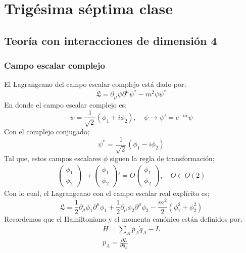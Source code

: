 \documentclass[../main.tex]{subfiles}
\begin{document}
\section{Trigésima séptima clase}
\subsection{Teoría con interacciones de dimensión 4}
\subsubsection{Campo escalar complejo}

El Lagrangeano del campo escalar complejo está dado por;
\begin{equation}
  \mathfrak{L} = \partial_\mu \psi \partial^\mu \psi^* -m^2 \psi\psi^* 
 \end{equation}
En donde el campo escalar complejo es;
\begin{equation}
  \psi = \frac{1}{\sqrt{2}} \left( \phi_1 + i\phi_2 \right), \quad \psi\rightarrow \psi'=e^{-i\alpha}\psi
 \end{equation}
Con el complejo conjugado;
\begin{equation}
  \psi^* = \frac{1}{\sqrt{2}} \left( \phi_1 - i \phi_2 \right)
 \end{equation}
 Tal que, estos campos escalares $\phi$ siguen la regla de transformación;
 \begin{align*}
   \begin{pmatrix}
     \phi_1 \\ \phi_2
   \end{pmatrix} \rightarrow \begin{pmatrix}
     \phi_1 \\ \phi_2
   \end{pmatrix} ' = O \begin{pmatrix}
     \phi_1 \\ \phi_2
   \end{pmatrix}, \quad O \in O(2)
 \end{align*}
 Con lo cual, el Lagrangeano con el campo escalar real explícito es;
 \begin{equation}
   \mathfrak{L} = \frac{1}{2}\partial_\mu \phi_1 \partial^\mu \phi_1 + \frac{1}{2}\partial_\mu \phi_2\partial^\mu \phi_2 - \frac{m^2}{2} \left( \phi_1^2 + \phi_2^2 \right)
  \end{equation}
 Recordemos que el Hamiltoniano y el momenta canónico están definidos por;
 \begin{align*}
   H = \sum_A p_A\dot{q}_A - L \\
   p_A = \frac{\partial L}{\partial \dot{q}_A}
 \end{align*}
\end{document}
